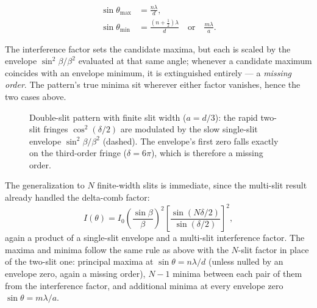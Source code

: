 \begin{fact}
\begin{align}
    \sin\theta_{\max} &= \frac{n\lambda}{d}, \\
    \sin\theta_{\min} &= \frac{(n+\tfrac12)\lambda}{d} \quad \text{or} \quad \frac{m\lambda}{a}.
\end{align}
\end{fact}

The interference factor sets the candidate maxima, but each is scaled by the envelope $\sin^2\beta/\beta^2$ evaluated at that same angle; whenever a candidate maximum coincides with an envelope minimum, it is extinguished entirely --- a \emph{missing order}. The pattern's true minima sit wherever either factor vanishes, hence the two cases above.

\begin{figure}[ht]
    \centering
    \caption{Double-slit pattern with finite slit width ($a = d/3$): the rapid two-slit fringes $\cos^2(\delta/2)$ are modulated by the slow single-slit envelope $\sin^2\beta/\beta^2$ (dashed). The envelope's first zero falls exactly on the third-order fringe ($\delta = 6\pi$), which is therefore a missing order.}
    \label{fig:combined}
\end{figure}

The generalization to $N$ finite-width slits is immediate, since the multi-slit result already handled the delta-comb factor:
\begin{equation}
    I(\theta) = I_0 \left(\frac{\sin\beta}{\beta}\right)^2 \left[\frac{\sin(N\delta/2)}{\sin(\delta/2)}\right]^2,
\end{equation}
again a product of a single-slit envelope and a multi-slit interference factor. The maxima and minima follow the same rule as above with the $N$-slit factor in place of the two-slit one: principal maxima at $\sin\theta = n\lambda/d$ (unless nulled by an envelope zero, again a missing order), $N-1$ minima between each pair of them from the interference factor, and additional minima at every envelope zero $\sin\theta = m\lambda/a$.

